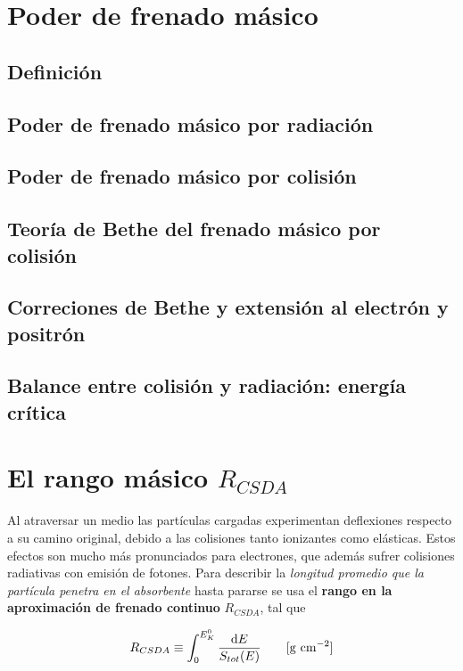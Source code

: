 \section{Poder de frenado másico}



\subsection{Definición}

\subsection{Poder de frenado másico por radiación}


\subsection{Poder de frenado másico por colisión}


\subsection{Teoría de Bethe del frenado másico por colisión}

\subsection{Correciones de Bethe y extensión al electrón y positrón}

\subsection{Balance entre colisión y radiación: energía crítica}


\section{El rango másico $R_{CSDA}$}

Al atraversar un medio las partículas cargadas experimentan deflexiones respecto a su camino original, debido a las colisiones tanto ionizantes como elásticas. Estos efectos son mucho más pronunciados para electrones, que además sufrer colisiones radiativas con emisión de fotones. Para describir la \textit{longitud promedio que la partícula penetra en el absorbente} hasta pararse se usa el \textbf{rango en la aproximación de frenado continuo} $R_{CSDA}$, tal que 

\begin{equation}
    R_{CSDA} \equiv \int_{0}^{E_K^0} \frac{\D E }{S_{tot}(E) } \qquad [\unit{g \ cm^{-2}}]
\end{equation}



